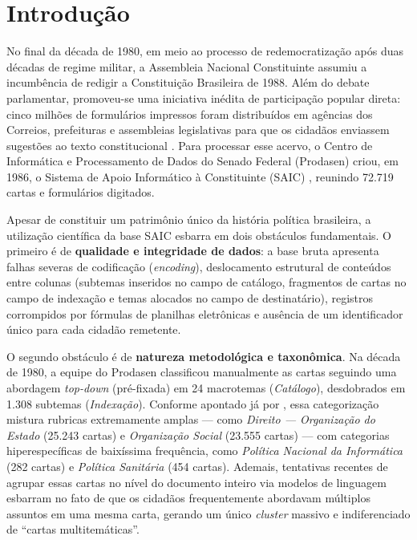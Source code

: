 \documentclass[12pt]{article}
\begin{document}
\section{Introdução}

No final da década de 1980, em meio ao processo de redemocratização após duas décadas de regime militar, a Assembleia Nacional Constituinte assumiu a incumbência de redigir a Constituição Brasileira de 1988. Além do debate parlamentar, promoveu-se uma iniciativa inédita de participação popular direta: cinco milhões de formulários impressos foram distribuídos em agências dos Correios, prefeituras e assembleias legislativas para que os cidadãos enviassem sugestões ao texto constitucional \cite{monclaire1991,agenciasenado2024}. Para processar esse acervo, o Centro de Informática e Processamento de Dados do Senado Federal (Prodasen) criou, em 1986, o Sistema de Apoio Informático à Constituinte (SAIC) \cite{senado1988}, reunindo 72.719 cartas e formulários digitados.

Apesar de constituir um patrimônio único da história política brasileira, a utilização científica da base SAIC esbarra em dois obstáculos fundamentais. O primeiro é de \textbf{qualidade e integridade de dados}: a base bruta apresenta falhas severas de codificação (\textit{encoding}), deslocamento estrutural de conteúdos entre colunas (subtemas inseridos no campo de catálogo, fragmentos de cartas no campo de indexação e temas alocados no campo de destinatário), registros corrompidos por fórmulas de planilhas eletrônicas e ausência de um identificador único para cada cidadão remetente.

O segundo obstáculo é de \textbf{natureza metodológica e taxonômica}. Na década de 1980, a equipe do Prodasen classificou manualmente as cartas seguindo uma abordagem \textit{top-down} (pré-fixada) em 24 macrotemas (\textit{Catálogo}), desdobrados em 1.308 subtemas (\textit{Indexação}). Conforme apontado já por \cite{monclaire1991}, essa categorização mistura rubricas extremamente amplas --- como \textit{Direito --- Organização do Estado} (25.243 cartas) e \textit{Organização Social} (23.555 cartas) --- com categorias hiperespecíficas de baixíssima frequência, como \textit{Política Nacional da Informática} (282 cartas) e \textit{Política Sanitária} (454 cartas). Ademais, tentativas recentes de agrupar essas cartas no nível do documento inteiro via modelos de linguagem \cite{agenciasenado2024} esbarram no fato de que os cidadãos frequentemente abordavam múltiplos assuntos em uma mesma carta, gerando um único \textit{cluster} massivo e indiferenciado de ``cartas multitemáticas''.
\end{document}
